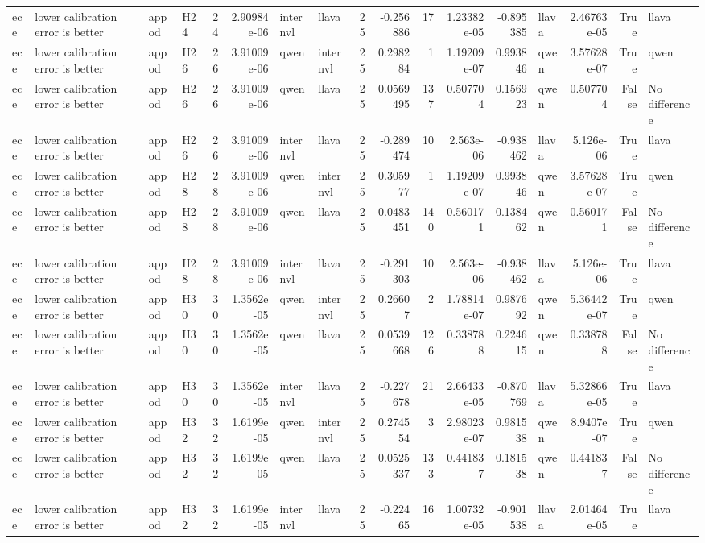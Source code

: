 \begin{longtable}{llllrrllrrrrrlrrl}
ece & lower calibration error is better & appod & H24 & 24 & 2.90984e-06 & internvl & llava & 25 & -0.256886 & 17 & 1.23382e-05 & -0.895385 & llava & 2.46763e-05 & True & llava \\
ece & lower calibration error is better & appod & H26 & 26 & 3.91009e-06 & qwen & internvl & 25 & 0.298284 & 1 & 1.19209e-07 & 0.993846 & qwen & 3.57628e-07 & True & qwen \\
ece & lower calibration error is better & appod & H26 & 26 & 3.91009e-06 & qwen & llava & 25 & 0.0569495 & 137 & 0.507704 & 0.156923 & qwen & 0.507704 & False & No difference \\
ece & lower calibration error is better & appod & H26 & 26 & 3.91009e-06 & internvl & llava & 25 & -0.289474 & 10 & 2.563e-06 & -0.938462 & llava & 5.126e-06 & True & llava \\
ece & lower calibration error is better & appod & H28 & 28 & 3.91009e-06 & qwen & internvl & 25 & 0.305977 & 1 & 1.19209e-07 & 0.993846 & qwen & 3.57628e-07 & True & qwen \\
ece & lower calibration error is better & appod & H28 & 28 & 3.91009e-06 & qwen & llava & 25 & 0.0483451 & 140 & 0.560171 & 0.138462 & qwen & 0.560171 & False & No difference \\
ece & lower calibration error is better & appod & H28 & 28 & 3.91009e-06 & internvl & llava & 25 & -0.291303 & 10 & 2.563e-06 & -0.938462 & llava & 5.126e-06 & True & llava \\
ece & lower calibration error is better & appod & H30 & 30 & 1.3562e-05 & qwen & internvl & 25 & 0.26607 & 2 & 1.78814e-07 & 0.987692 & qwen & 5.36442e-07 & True & qwen \\
ece & lower calibration error is better & appod & H30 & 30 & 1.3562e-05 & qwen & llava & 25 & 0.0539668 & 126 & 0.338788 & 0.224615 & qwen & 0.338788 & False & No difference \\
ece & lower calibration error is better & appod & H30 & 30 & 1.3562e-05 & internvl & llava & 25 & -0.227678 & 21 & 2.66433e-05 & -0.870769 & llava & 5.32866e-05 & True & llava \\
ece & lower calibration error is better & appod & H32 & 32 & 1.6199e-05 & qwen & internvl & 25 & 0.274554 & 3 & 2.98023e-07 & 0.981538 & qwen & 8.9407e-07 & True & qwen \\
ece & lower calibration error is better & appod & H32 & 32 & 1.6199e-05 & qwen & llava & 25 & 0.0525337 & 133 & 0.441837 & 0.181538 & qwen & 0.441837 & False & No difference \\
ece & lower calibration error is better & appod & H32 & 32 & 1.6199e-05 & internvl & llava & 25 & -0.22465 & 16 & 1.00732e-05 & -0.901538 & llava & 2.01464e-05 & True & llava \\

\end{longtable}
